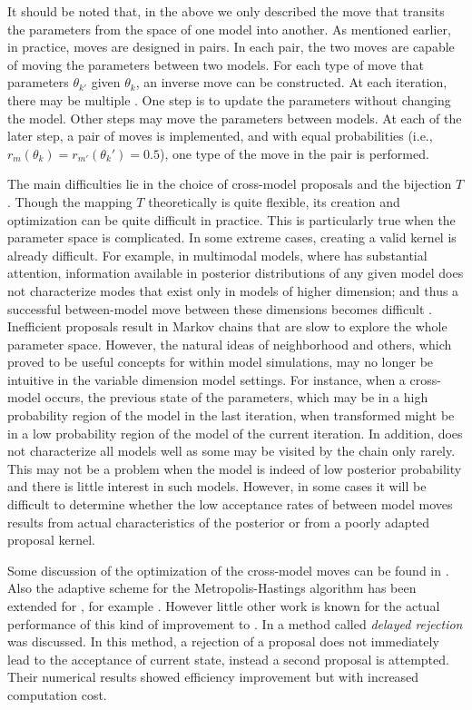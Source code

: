 It should be noted that, in the above we only described the move that transits the parameters from the space of one model into another. As mentioned earlier, in practice, \rjmcmc moves are designed in pairs. In each pair, the two moves are capable of moving the parameters between two models. For each type of move that  parameters $\theta_{k'}$ given $\theta_k$, an inverse move can be constructed. At each iteration, there may be multiple . One step is to update the parameters without changing the model. Other steps may move the parameters between models. At each of the later step, a pair of moves is implemented, and with equal probabilities (i.e., $r_m(\theta_k) = r_{m'}(\theta_k') = 0.5$), one type of the move in the pair is performed.

The main difficulties lie in the choice of cross-model proposals and the bijection $T$. Though the mapping $T$ theoretically is quite flexible, its creation and optimization can be quite difficult in practice. This is particularly true when the parameter space is complicated. In some extreme cases, creating a valid kernel is already difficult. For example, in multimodal models, where \rjmcmc has  substantial attention, information available in posterior distributions of any given model does not characterize modes that exist only in models of higher dimension; and thus a successful between-model move between these dimensions becomes difficult \cite{Jasra:2007id}. Inefficient proposals result in Markov chains that are slow to explore the whole parameter space. However, the natural ideas of neighborhood and others, which proved to be useful concepts for within model simulations, may no longer be intuitive in the variable dimension model settings. For instance, when a cross-model occurs, the previous state of the parameters, which may be in a high probability region of the model in the last iteration, when transformed might be in a low probability region of the model of the current iteration. In addition, \rjmcmc does not characterize all models well as some may be visited by the chain only rarely. This may not be a problem when the model is indeed of low posterior probability and there is little interest in such models. However, in some cases it will be difficult to determine whether the low acceptance rates of between model moves results from actual characteristics of the posterior or from a poorly adapted proposal kernel.

Some discussion of the optimization of the cross-model moves can be found in \cite{Green:2009tr}. Also the adaptive scheme for the Metropolis-Hastings algorithm has been extended for \rjmcmc, for example \cite{Hastie:2005vi}. However little other work is known for the actual performance of this kind of improvement to \rjmcmc. In \cite{Green:2001tk} a method called \emph{delayed rejection} was discussed. In this method, a rejection of a proposal does not immediately lead to the acceptance of current state, instead a second proposal is attempted. Their numerical results showed efficiency improvement but with increased computation cost.

